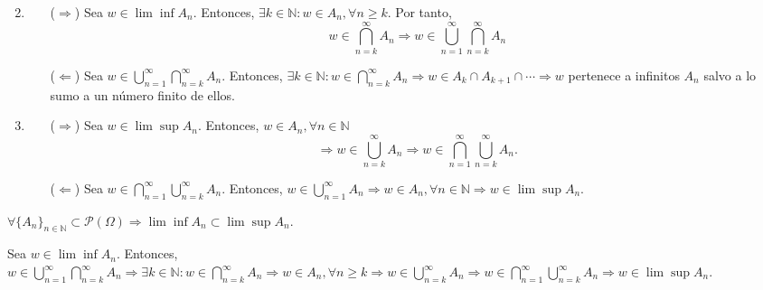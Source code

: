 \begin{dem}
  \begin{enumerate}[label=(\roman*)]
    \item []
    \item
      \begin{enumerate}[label=(\roman*)]
        \item [($\Rightarrow$)]  Sea $w \in \lim \inf A_n$. Entonces, $\exists k \in \mathbb{N} : w \in A_{n}, \forall n \geq k$. Por tanto,
          \[ 
            w \in \bigcap_{n = k}^{\infty} A_{n} \Rightarrow w \in \bigcup_{n = 1}^{\infty} \bigcap_{n = k}^{\infty} A_{n}
          \] 
        \item [($\Leftarrow$)] Sea $w \in \bigcup_{n = 1}^{\infty} \bigcap_{n = k}^{\infty} A_{n}$. Entonces, $\exists k \in \mathbb{N} : w \in \bigcap_{n = k}^{\infty} A_{n} \Rightarrow w \in A_{k} \cap A_{k+1} \cap \cdots \Rightarrow w$ pertenece a infinitos $A_{n}$ salvo a lo sumo a un número finito de ellos.
      \end{enumerate}
    \item 
      \begin{enumerate}[label=(\roman*)]
        \item [($\Rightarrow$)] Sea $w \in \lim \sup A_n$. Entonces, $w \in A_{n}, \forall n \in \mathbb{N}$
          \[
            \Rightarrow w \in \bigcup_{n = k}^{\infty} A_{n} \Rightarrow w \in \bigcap_{n = 1}^{\infty} \bigcup_{n = k}^{\infty} A_{n}.
          \]
        \item [($\Leftarrow$)] Sea $w \in \bigcap_{n = 1}^{\infty} \bigcup_{n = k}^{\infty} A_{n}$. Entonces, $w \in \bigcup_{n = 1}^{\infty} A_{n} \Rightarrow w \in A_{n}, \forall n \in \mathbb{N} \Rightarrow w \in \lim \sup A_n$.
      \end{enumerate}
  \end{enumerate}
\end{dem}

\begin{prop}
  $\forall \{ A_{n} \}_{n \in \mathbb{N}} \subset \mathcal{P}(\Omega) \Rightarrow \lim \inf A_{n} \subset \lim \sup A_n$.
\end{prop}

\begin{dem}
  Sea $w \in \lim \inf A_{n}$. Entonces, $w \in \bigcup_{n = 1}^{\infty} \bigcap_{n = k}^{\infty} A_{n} \Rightarrow \exists k \in \mathbb{N} : w \in \bigcap_{n = k}^{\infty} A_{n} \Rightarrow w \in A_{n}, \forall n \geq k \Rightarrow w \in \bigcup_{n = k}^{\infty} A_{n} \Rightarrow w \in \bigcap_{n = 1}^{\infty} \bigcup_{n = k}^{\infty} A_{n} \Rightarrow w \in \lim \sup A_n$.
\end{dem}

